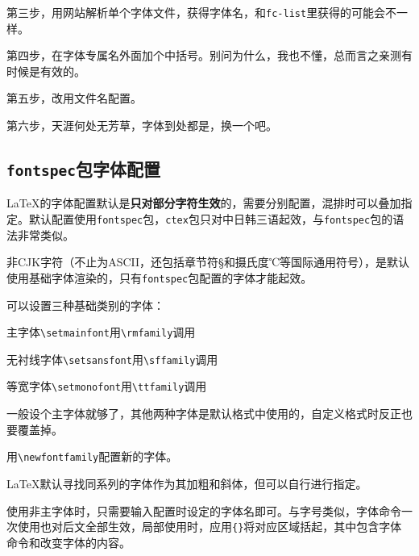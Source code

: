 \documentclass[10pt,openany]{book}
\begin{document}
\begin{sloppypar}
    第三步，用网站解析单个字体文件，获得字体名，和\texttt{fc-list}里获得的可能会不一样。

    第四步，在字体专属名外面加个中括号。别问为什么，我也不懂，总而言之亲测有时候是有效的。

    

    第五步，改用文件名配置。

    第六步，天涯何处无芳草，字体到处都是，换一个吧。

    \subsection{\texttt{fontspec}包字体配置}

    {\LaTeX}的字体配置默认是\textbf{只对部分字符生效}的，需要分别配置，混排时可以叠加指定。默认配置使用\texttt{fontspec}包，\texttt{ctex}包只对中日韩三语起效，与\texttt{fontspec}包的语法非常类似。

    非CJK字符（不止为ASCII，还包括章节符{\S}和摄氏度{\tempfont ℃}等国际通用符号），是默认使用基础字体渲染的，只有\texttt{fontspec}包配置的字体才能起效。

    

    可以设置三种基础类别的字体：

    \begin{tightitem}
        \item 主字体\texttt{\textbackslash{}setmainfont}用\texttt{\textbackslash{}rmfamily}调用
        \item 无衬线字体\texttt{\textbackslash{}setsansfont}用\texttt{\textbackslash{}sffamily}调用
        \item 等宽字体\texttt{\textbackslash{}setmonofont}用\texttt{\textbackslash{}ttfamily}调用
    \end{tightitem}

    一般设个主字体就够了，其他两种字体是默认格式中使用的，自定义格式时反正也要覆盖掉。

    用\texttt{\textbackslash{}newfontfamily}配置新的字体。

    

    {\LaTeX}默认寻找同系列的字体作为其加粗和斜体，但可以自行进行指定。

    

    使用非主字体时，只需要输入配置时设定的字体名即可。与字号类似，字体命令一次使用也对后文全部生效，局部使用时，应用\texttt{\{\}}将对应区域括起，其中包含字体命令和改变字体的内容。


\end{sloppypar}
\end{document}
